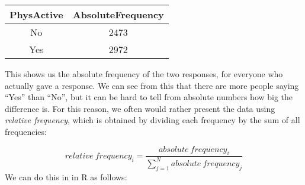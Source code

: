 \documentclass[]{book}
\newenvironment{Shaded}{\begin{snugshade}}{\end{snugshade}}
\newcommand{\KeywordTok}[1]{\textcolor[rgb]{0.13,0.29,0.53}{\textbf{#1}}}
\newcommand{\DataTypeTok}[1]{\textcolor[rgb]{0.13,0.29,0.53}{#1}}
\newcommand{\StringTok}[1]{\textcolor[rgb]{0.31,0.60,0.02}{#1}}
\newcommand{\CommentTok}[1]{\textcolor[rgb]{0.56,0.35,0.01}{\textit{#1}}}
\newcommand{\OperatorTok}[1]{\textcolor[rgb]{0.81,0.36,0.00}{\textbf{#1}}}
\newcommand{\NormalTok}[1]{#1}
\theoremstyle{definition}
\theoremstyle{definition}
\theoremstyle{definition}
\theoremstyle{remark}
\begin{document}
\begin{longtable}[]{@{}cc@{}}
\toprule
\begin{minipage}[b]{0.17\columnwidth}\centering\strut
PhysActive\strut
\end{minipage} & \begin{minipage}[b]{0.25\columnwidth}\centering\strut
AbsoluteFrequency\strut
\end{minipage}\tabularnewline
\midrule
\endhead
\begin{minipage}[t]{0.17\columnwidth}\centering\strut
No\strut
\end{minipage} & \begin{minipage}[t]{0.25\columnwidth}\centering\strut
2473\strut
\end{minipage}\tabularnewline
\begin{minipage}[t]{0.17\columnwidth}\centering\strut
Yes\strut
\end{minipage} & \begin{minipage}[t]{0.25\columnwidth}\centering\strut
2972\strut
\end{minipage}\tabularnewline
\bottomrule
\end{longtable}

This shows us the absolute frequency of the two responses, for everyone
who actually gave a response. We can see from this that there are more
people saying ``Yes'' than ``No'', but it can be hard to tell from
absolute numbers how big the difference is. For this reason, we often
would rather present the data using \emph{relative frequency}, which is
obtained by dividing each frequency by the sum of all frequencies:

\[
relative\ frequency_i = \frac{absolute\ frequency_i}{\sum_{j=1}^N absolute\ frequency_j}
\] We can do this in in R as follows:

\begin{Shaded}
\end{Shaded}
\end{document}
